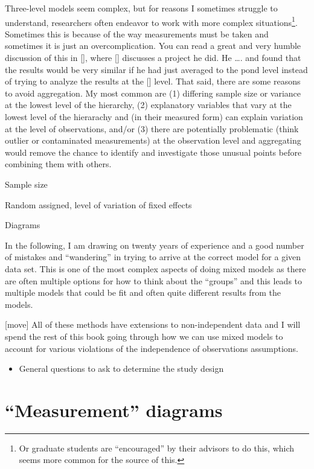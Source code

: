 \documentclass[
]{book}
\providecommand{\tightlist}{%
  \setlength{\itemsep}{0pt}\setlength{\parskip}{0pt}}
\begin{document}
Three-level models seem complex, but for reasons I sometimes struggle to understand, researchers often endeavor to work with more complex situations\footnote{Or graduate students are ``encouraged'' by their advisors to do this, which seems more common for the source of this.}. Sometimes this is because of the way measurements must be taken and sometimes it is just an overcomplication. You can read a great and very humble discussion of this in {[}{]}, where {[}{]} discusses a project he did. He \ldots. and found that the results would be very similar if he had just averaged to the pond level instead of trying to analyze the results at the {[}{]} level. That said, there are some reasons to avoid aggregation. My most common are (1) differing sample size or variance at the lowest level of the hierarchy, (2) explanatory variables that vary at the lowest level of the hierarachy and (in their measured form) can explain variation at the level of observations, and/or (3) there are potentially problematic (think outlier or contaminated measurements) at the observation level and aggregating would remove the chance to identify and investigate those unusual points before combining them with others.

Sample size

Random assigned, level of variation of fixed effects

Diagrams

\indent In the following, I am drawing on twenty years of experience and a good number of mistakes and ``wandering'' in trying to arrive at the correct model for a given data set. This is one of the most complex aspects of doing mixed models as there are often multiple options for how to think about the ``groups'' and this leads to multiple models that could be fit and often quite different results from the models.

{[}move{]} All of these methods have extensions to non-independent data and I will spend the rest of this book going through how we can use mixed models to account for various violations of the independence of observations assumptions.

\begin{itemize}
\tightlist
\item
  General questions to ask to determine the study design
\end{itemize}

\hypertarget{section3-2}{%
\section{``Measurement'' diagrams}\label{section3-2}}
\end{document}
